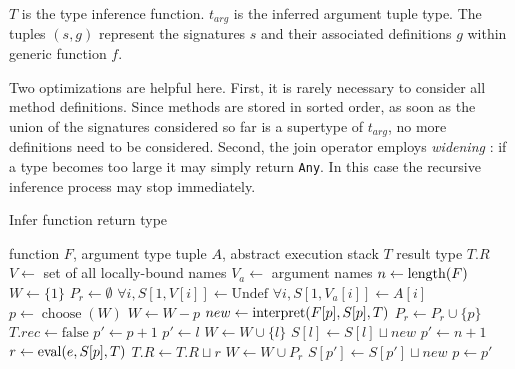 \noindent
$T$ is the type inference function.
$t_{arg}$ is the inferred argument tuple type. The tuples $(s,g)$
represent the signatures $s$ and their associated definitions $g$ within
generic function $f$.

Two optimizations are helpful here. First, it is rarely
necessary to consider all method definitions. Since methods are stored in
sorted order, as soon as the union of the signatures considered so far is a
supertype of $t_{arg}$, no more definitions need to be considered.
Second, the join operator employs \emph{widening} \cite{widening}:
if a type becomes too large it may simply return {\tt Any}. In this case
the recursive inference process may stop immediately.


\renewcommand{\algorithmicrequire}{\textbf{Input:}}
\renewcommand{\algorithmicensure}{\textbf{Output:}}

\begin{algorithm}
\caption{Infer function return type}
\label{alg1}
\begin{algorithmic}
\REQUIRE function $F$, argument type tuple $A$, abstract execution stack $T$
\ENSURE result type $T.R$
\STATE $V \leftarrow$ set of all locally-bound names
\STATE $V_{a} \leftarrow$ argument names
\STATE $n \leftarrow \operatorname{length}(F)$
\STATE $W \leftarrow \{1\}$ 
\STATE $P_r \leftarrow \emptyset$ 
\STATE $\forall i, S[1,V[i]] \leftarrow \text{Undef}$
\STATE $\forall i, S[1,V_{a}[i]] \leftarrow A[i]$
 \STATE $p \leftarrow \operatorname{choose}(W)$
 \REPEAT
  \STATE $W \leftarrow W - p$
  \STATE $new \leftarrow \operatorname{interpret}(F[p],S[p],T)$
   \STATE $P_r \leftarrow P_r \cup \{p\}$
   \STATE $T.rec \leftarrow \text{false}$
  \ENDIF
  \STATE $p\prime \leftarrow p+1$
   \STATE $p\prime \leftarrow l$
    \STATE $W \leftarrow W \cup \{l\}$
    \STATE $S[l] \leftarrow S[l] \sqcup new$
   \ENDIF
   \STATE $p\prime \leftarrow n+1$
   \STATE $r \leftarrow \operatorname{eval}(e,S[p],T)$
    \STATE $T.R \leftarrow T.R \sqcup r$
    \STATE $W \leftarrow W \cup P_r$
   \ENDIF
  \ENDIF
   \STATE $S[p\prime] \leftarrow S[p\prime] \sqcup new$
   \STATE $p \leftarrow p\prime$
  \ENDIF
\ENDWHILE
{}
\end{algorithmic}
\end{algorithm}

